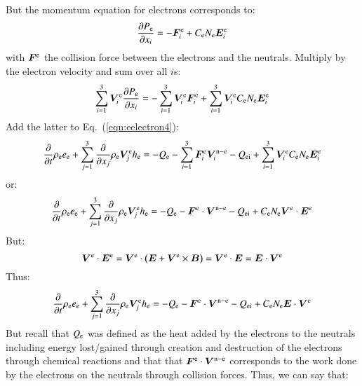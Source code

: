 \documentclass{warpdoc}
\renewcommand{\vec}[1]{\bm{#1}}
\begin{document}
%  
But the momentum equation for electrons corresponds to:
%
\begin{equation}
  \frac{\partial P_{\rm e}}{\partial x_i} = -\vec{F}_i^{\rm e} + C_{\rm e} N_{\rm e} \vec{E}^{\rm e}_i
\end{equation}
%
with $\vec{F}^{\rm e}$ the collision force between the electrons and the neutrals. Multiply by the electron velocity and sum over all $i$s:
%
\begin{equation}
  \sum_{i=1}^3 \vec{V}_i^{\rm e} \frac{\partial P_{\rm e}}{\partial x_i} = -\sum_{i=1}^3 \vec{V}_i^{\rm e} \vec{F}_i^{\rm e} + \sum_{i=1}^3 \vec{V}_i^{\rm e} C_{\rm e} N_{\rm e} \vec{E}^{\rm e}_i
\end{equation}
%
Add the latter to Eq.\ (\ref{eqn:eelectron4}):
%
\begin{equation}
 \frac{\partial }{\partial t}\rho_{\rm e} e_{\rm e} + \sum_{j=1}^3  \frac{\partial }{\partial x_j} \rho_{\rm e} \vec{V}^{\rm e}_j h_{\rm e} 
= 
- Q_{{\rm e}}
-\sum_{i=1}^3 \vec{F}_i^{\rm e}  \vec{V}_i^{{\rm n}-{\rm e}} 
- Q_{\rm ei}
+ \sum_{i=1}^3 \vec{V}_i^{\rm e} C_{\rm e} N_{\rm e} \vec{E}^{\rm e}_i
\end{equation}
%  
or:
%
\begin{equation}
 \frac{\partial }{\partial t}\rho_{\rm e} e_{\rm e} + \sum_{j=1}^3  \frac{\partial }{\partial x_j} \rho_{\rm e} \vec{V}^{\rm e}_j h_{\rm e} 
= 
- Q_{{\rm e}}
- \vec{F}^{\rm e}\cdot  \vec{V}^{{\rm n}-{\rm e}} 
- Q_{\rm ei}
+   C_{\rm e} N_{\rm e} \vec{V}^{\rm e} \cdot \vec{E}^{\rm e}
\end{equation}
%  
But:
%
\begin{equation}
\vec{V}^{\rm e} \cdot \vec{E}^{\rm e} =
\vec{V}^{\rm e} \cdot \left( \vec{E}+\vec{V}^{\rm e} \times \vec{B}\right)
= \vec{V}^{\rm e} \cdot \vec{E}
=   \vec{E}\cdot \vec{V}^{\rm e}
\end{equation}
%
Thus:
%
\begin{equation}
 \frac{\partial }{\partial t}\rho_{\rm e} e_{\rm e} + \sum_{j=1}^3  \frac{\partial }{\partial x_j} \rho_{\rm e} \vec{V}^{\rm e}_j h_{\rm e} 
= 
- Q_{{\rm e}}
- \vec{F}^{\rm e}\cdot  \vec{V}^{{\rm n}-{\rm e}} 
- Q_{\rm ei}
+   C_{\rm e} N_{\rm e} \vec{E} \cdot \vec{V}^{\rm e}  
\end{equation}
%  
But recall that $Q_{\rm e}$ was defined as the heat added by the electrons to the neutrals including energy lost/gained through creation and destruction of the electrons through chemical reactions and that that $\vec{F}^{\rm e}\cdot  \vec{V}^{{\rm n}-{\rm e}}$ corresponds to the work done by the electrons on the neutrals through collision forces.  Thus, we can say that:
\end{document}

